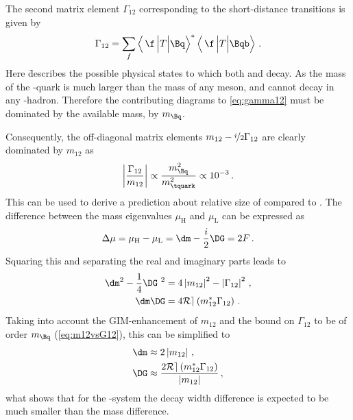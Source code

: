 The second matrix element $\Gamma_{12}$ corresponding to the short-distance transitions is given by
\begin{equation}
\Gamma_{12}=\sum_f\left<\,\f\,\Big|T\Big|\Bq\right>^\ast\left<\,\f\,\Big|T\Big|\Bqb\right>\,.\label{eq:gamma12}
\end{equation}
Here \f describes the possible physical states to which both \Bq and \Bqb decay.
As the mass of the \quark-quark is much larger than the mass of any \B meson, \Bq and \Bqb cannot decay in any \tquark-hadron.
Therefore the contributing diagrams to \cref{eq:gamma12} must be dominated by the available mass, \ie by $m_\Bq$.

Consequently, the off-diagonal matrix elements $m_{12}-\nicefrac{i}{2}\Gamma_{12}$ are clearly dominated by $m_{12}$ as
\begin{equation}
\left|\frac{\Gamma_{12}}{m_{12}}\right|\propto\frac{m_\Bq^2}{m_\tquark^2}\propto10^{-3}\,.\label{eq:m12vsG12}
\end{equation}
This can be used to derive a prediction about relative size of \DG compared to \dm.
The difference between the mass eigenvalues $\mu_\text{H}$ and $\mu_\text{L}$ can be expressed as
\begin{equation}
\Delta\mu=\mu_\text{H}-\mu_\text{L}=\dm-\frac{i}{2}\DG=2F\,.
\end{equation}
Squaring this and separating the real and imaginary parts leads to
\begin{equation}
\begin{aligned}
\dm^2-\frac{1}{4}\DG^{\kern 3.4pt2}&=4\left|m_{12}\right|^2-\left|\Gamma_{12}\right|^2\,,\\
\dm\DG&=4\mathcal{Re}\left(m_{12}^\ast\Gamma_{12}\right)\,.
\end{aligned}
\end{equation}
Taking into account the GIM-enhancement of $m_{12}$ and the bound on $\Gamma_{12}$ to be of order $m_\Bq$ (\cref{eq:m12vsG12}), this can be simplified to
\begin{equation}
\begin{aligned}
\dm&\approx2\left|m_{12}\right|\,,\\
\DG&\approx\frac{2\mathcal{Re}\left(m_{12}^\ast\Gamma_{12}\right)}{\left|m_{12}\right|}\,,
\end{aligned}
\end{equation}
what shows that for the \Bz-system the decay width difference is expected to be much smaller than the mass difference.

